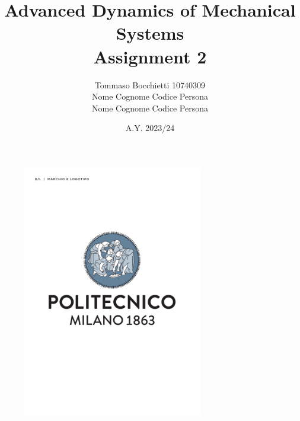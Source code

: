 \documentclass{assignment}
\begin{document}
\title{Advanced Dynamics of Mechanical Systems \\ Assignment 2}
\author{Tommaso Bocchietti 10740309 \\ Nome Cognome Codice Persona \\ Nome Cognome Codice Persona}
\date{A.Y. 2023/24}

\maketitle

\begin{figure}[H]
    \centering
    \includegraphics[width=0.7\textwidth]{./pdf/Polimi_logo_coverpage.pdf}
    \label{fig:Polimi_logo}
\end{figure}

\clearpage
\tableofcontents
\listoffigures
\listoftables

\clearpage





% 

% 
% 
\end{document}
